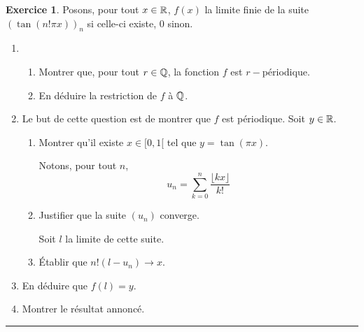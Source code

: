 \documentclass[a4paper,11pt]{article}
\theoremstyle{definition}
\newtheorem{exo}{Exercice} %
\begin{document}
\begin{minipage}{1\linewidth}
\begin{minipage}[t]{0.48\linewidth}
\begin{exo}
	Posons, pour tout $x \in \mathbb{R}$, $f (x )$ la limite finie de la suite $(\tan(n!\pi x ))_n$ si celle-ci existe, $0$ sinon.
	\begin{enumerate}
		\item \begin{enumerate}
			\item Montrer que, pour tout $r \in \mathbb{Q}$, la fonction $f$ est $r-$périodique.
			\item En déduire la restriction de $f$ à $\mathbb{Q}$.
		\end{enumerate}
		\item Le but de cette question est de montrer que $f$ est périodique. Soit $y \in \mathbb{R}$.
		\begin{enumerate}
			\item Montrer qu’il existe $x \in [0, 1[$ tel que $y = \tan(\pi x )$.
			
			Notons, pour tout $n$,
			$$u_n = \sum^{n}_{k=0}\dfrac{\lfloor kx \rfloor}{k!}$$
			\item Justifier que la suite $(u_n)$ converge. 
			
			Soit $l$ la limite de cette suite.
			\item Établir que $n!(l - u_n ) \longrightarrow x $.
		\end{enumerate}
		\item En déduire que $f (l) = y $.
		\item Montrer le résultat annoncé.
		
	\end{enumerate}
	
	\centering
	\rule{1\linewidth}{0.6pt}
\end{exo}
		
		
		
	\end{minipage}
\end{minipage}

		
\end{document}
